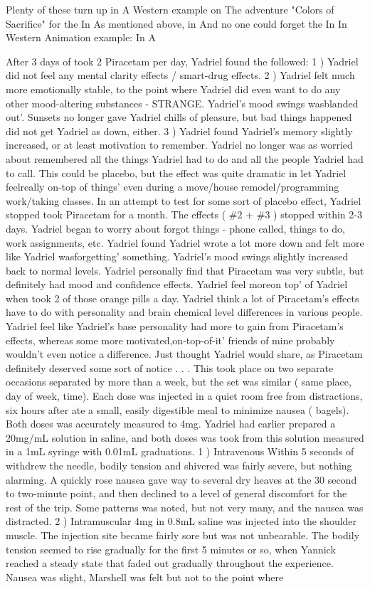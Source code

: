 \documentclass[12pt]{book}
\begin{document}
Plenty of these turn up in A Western example on The adventure "Colors of Sacrifice" for the In As mentioned above, in And no one could forget the In In Western Animation example: In A



After 3 days of took 2 Piracetam per day, Yadriel found the followed: 1 ) Yadriel did not feel any mental clarity effects / smart-drug effects. 2 ) Yadriel felt much more emotionally stable, to the point where Yadriel did even want to do any other mood-altering substances - STRANGE. Yadriel's mood swings wasblanded out'. Sunsets no longer gave Yadriel chills of pleasure, but bad things happened did not get Yadriel as down, either. 3 ) Yadriel found Yadriel's memory slightly increased, or at least motivation to remember. Yadriel no longer was as worried about remembered all the things Yadriel had to do and all the people Yadriel had to call. This could be placebo, but the effect was quite dramatic in let Yadriel feelreally on-top of things' even during a move/house remodel/programming work/taking classes. In an attempt to test for some sort of placebo effect, Yadriel stopped took Piracetam for a month. The effects ( \#2 + \#3 ) stopped within 2-3 days. Yadriel began to worry about forgot things - phone called, things to do, work assignments, etc. Yadriel found Yadriel wrote a lot more down and felt more like Yadriel wasforgetting' something. Yadriel's mood swings slightly increased back to normal levels. Yadriel personally find that Piracetam was very subtle, but definitely had mood and confidence effects. Yadriel feel moreon top' of Yadriel when took 2 of those orange pills a day. Yadriel think a lot of Piracetam's effects have to do with personality and brain chemical level differences in various people. Yadriel feel like Yadriel's base personality had more to gain from Piracetam's effects, whereas some more motivated,on-top-of-it' friends of mine probably wouldn't even notice a difference. Just thought Yadriel would share, as Piracetam definitely deserved some sort of notice . . . This took place on two separate occasions separated by more than a week, but the set was similar ( same place, day of week, time). Each dose was injected in a quiet room free from distractions, six hours after ate a small, easily digestible meal to minimize nausea ( bagels). Both doses was accurately measured to 4mg. Yadriel had earlier prepared a 20mg/mL solution in saline, and both doses was took from this solution measured in a 1mL syringe with 0.01mL graduations. 1 ) Intravenous Within 5 seconds of withdrew the needle, bodily tension and shivered was fairly severe, but nothing alarming. A quickly rose nausea gave way to several dry heaves at the 30 second to two-minute point, and then declined to a level of general discomfort for the rest of the trip. Some patterns was noted, but not very many, and the nausea was distracted. 2 ) Intramuscular 4mg in 0.8mL saline was injected into the shoulder muscle. The injection site became fairly sore but was not unbearable. The bodily tension seemed to rise gradually for the first 5 minutes or so, when Yannick reached a steady state that faded out gradually throughout the experience. Nausea was slight, Marshell was felt but not to the point where 
\end{document}

